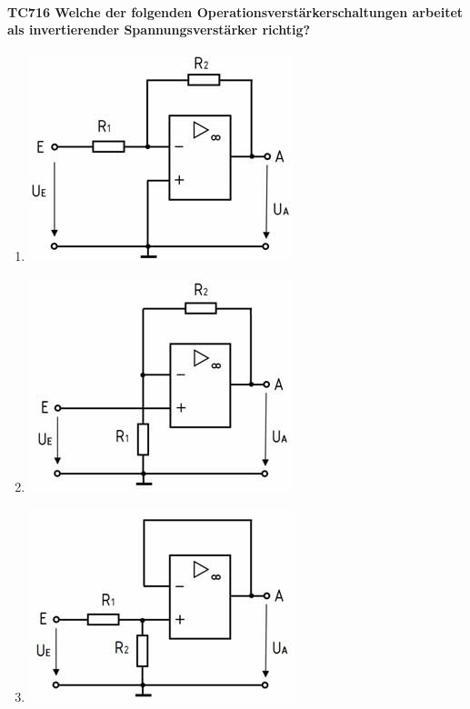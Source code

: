 \documentclass[8pt]{article}
\begin{document}
\begin{enumerate}
\begin{enumerate}[nolistsep,label=\Alph*]
{\begin{enumerate}[nolistsep,label=\Alph*]
\paragraph*{TC716 Welche der folgenden Operationsverstärkerschaltungen arbeitet als invertierender Spannungsverstärker richtig?}
\begin{enumerate}[nolistsep,label=\Alph*]
\item 
\begin{center}
	\begin{minipage}{\linewidth}
		\centering
		\includegraphics[scale=1.0]{pics/tc716_a.jpg}
	\end{minipage}
\end{center}
\item
\begin{center}
	\begin{minipage}{\linewidth}
		\centering
		\includegraphics[scale=1.0]{pics/tc716_b.jpg}
	\end{minipage}
\end{center}
\item
\begin{center}
	\begin{minipage}{\linewidth}
		\centering
		\includegraphics[scale=1.0]{pics/tc716_c.jpg}

\end{minipage}
\end{center}
\end{enumerate}
\end{enumerate}}
\end{enumerate}
\end{enumerate}
\end{document}
